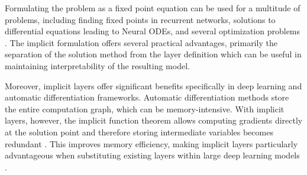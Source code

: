 Formulating the problem as a fixed point equation can be used for a multitude of problems, including finding fixed points in recurrent networks, solutions to differential equations leading to Neural ODEs, and several optimization problems \citep{Chen2019}. The implicit formulation offers several practical advantages, primarily the separation of the solution method from the layer definition which can be useful in maintaining interpretability of the resulting model\citep{Kawaguchi2021}.

Moreover, implicit layers offer significant benefits specifically in deep learning and automatic differentiation frameworks. Automatic differentiation methods store the entire computation graph, which can be memory-intensive. With implicit layers, however, the implicit function theorem allows computing gradients directly at the solution point and therefore storing intermediate variables becomes redundant \citep{Massaroli2021}. This improves memory efficiency, making implicit layers particularly advantageous when substituting existing layers within large deep learning models \citep{Li2020}.
